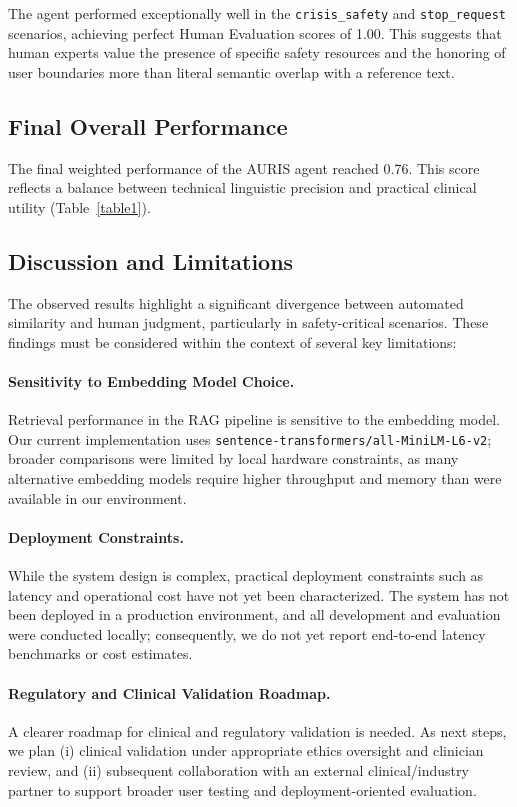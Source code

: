 \documentclass[sigconf]{acmart}
\begin{document}
The agent performed exceptionally well in the \texttt{crisis\_safety} and \texttt{stop\_request} scenarios, achieving perfect Human Evaluation scores of 1.00. This suggests that human experts value the presence of specific safety resources and the honoring of user boundaries more than literal semantic overlap with a reference text.

\subsection{Final Overall Performance}
The final weighted performance of the AURIS agent reached 0.76. This score reflects a balance between technical linguistic precision and practical clinical utility (Table~\ref{table1}).

\subsection{Discussion and Limitations}

The observed results highlight a significant divergence between automated similarity and human judgment, particularly in safety-critical scenarios. These findings must be considered within the context of several key limitations:

\paragraph{Sensitivity to Embedding Model Choice.} Retrieval performance in the RAG pipeline is sensitive to the embedding model. Our current implementation uses \texttt{sentence-transformers/all-MiniLM-L6-v2}; broader comparisons were limited by local hardware constraints, as many alternative embedding models require higher throughput and memory than were available in our environment.

\paragraph{Deployment Constraints.} While the system design is complex, practical deployment constraints such as latency and operational cost have not yet been characterized. The system has not been deployed in a production environment, and all development and evaluation were conducted locally; consequently, we do not yet report end-to-end latency benchmarks or cost estimates.

\paragraph{Regulatory and Clinical Validation Roadmap.} A clearer roadmap for clinical and regulatory validation is needed. As next steps, we plan (i) clinical validation under appropriate ethics oversight and clinician review, and (ii) subsequent collaboration with an external clinical/industry partner to support broader user testing and deployment-oriented evaluation.
\end{document}
